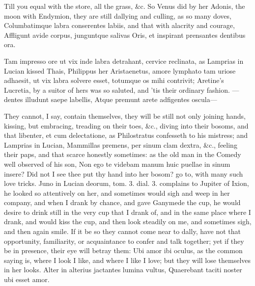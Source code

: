 {Till you equal with the store, all the grass, \&c. So Venus did by her
Adonis, the moon with Endymion, they are still dallying and culling, as
so many doves, Columbatimque labra conserentes labiis, and that with
alacrity and courage,
Affligunt avide corpus, junguntque salivas
Oris, et inspirant prensantes dentibus ora.

Tam impresso ore ut vix inde labra detrahant, cervice reclinata,
as Lamprias in Lucian kissed Thais, Philippus her Aristaenetus,
amore lymphato tam uriose adhaesit, ut vix labra solvere esset,
totumque os mihi contrivit; Aretine's Lucretia, by a suitor of
hers was so saluted, and 'tis their ordinary fashion.
---dentes illudunt saepe labellis,
Atque premunt arete adfigentes oscula---

They cannot, I say, contain themselves, they will be still not only
joining hands, kissing, but embracing, treading on their toes, \&c.,
diving into their bosoms, and that libenter, et cum delectatione, as
 Philostratus confesseth to his mistress; and Lamprias in Lucian,
Mammillas premens, per sinum clam dextra, \&c., feeling their paps, and
that scarce honestly sometimes: as the old man in the Comedy well
observed of his son, Non ego te videbam manum huic puellae in sinum
insere? Did not I see thee put thy hand into her bosom? go to, with
many such love tricks. Juno in Lucian deorum, tom. 3. dial. 3.
complains to Jupiter of Ixion, he looked so attentively on her,
and sometimes would sigh and weep in her company, and when I drank by
chance, and gave Ganymede the cup, he would desire to drink still in
the very cup that I drank of, and in the same place where I drank, and
would kiss the cup, and then look steadily on me, and sometimes sigh,
and then again smile. If it be so they cannot come near to dally, have
not that opportunity, familiarity, or acquaintance to confer and talk
together; yet if they be in presence, their eye will betray them: Ubi
amor ibi oculus, as the common saying is, where I look I like, and
where I like I love; but they will lose themselves in her looks.
Alter in alterius jactantes lumina vultus,
Quaerebant taciti noster ubi esset amor.

}

